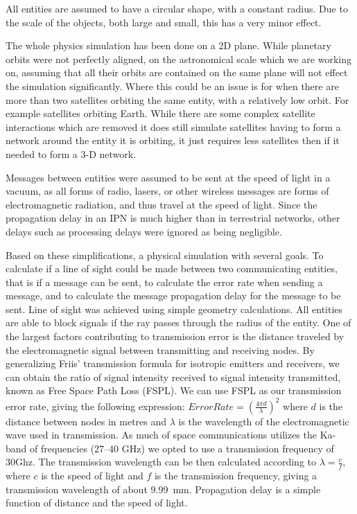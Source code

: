 \documentclass[a4paper,12pt]{article}
\begin{document}
All entities are assumed to have a circular shape, with a constant radius. Due
to the scale of the objects, both large and small, this has a very minor effect.

The whole physics simulation has been done on a 2D plane. While planetary orbits
were not perfectly aligned, on the astronomical scale which we are working on,
assuming that all their orbits are contained on the same plane will not effect
the simulation significantly. Where this could be an issue is for when there are
more than two satellites orbiting the same entity, with a relatively low orbit.
For example satellites orbiting Earth. While there are some complex satellite
interactions which are removed it does still simulate satellites having to form
a network around the entity it is orbiting, it just requires less satellites
then if it needed to form a 3-D network.

Messages between entities were assumed to be sent at the speed of light in a
vacuum, as all forms of radio, lasers, or other wireless messages are forms of
electromagnetic radiation, and thus travel at the speed of light. Since the
propagation delay in an IPN is much higher than in terrestrial networks, other
delays such as processing delays were ignored as being negligible.

Based on these simplifications, a physical simulation with several goals. To
calculate if a line of sight could be made between two communicating entities,
that is if a message can be sent, to calculate the error rate when sending a
message, and to calculate the message propagation delay for the message to be
sent. Line of sight was achieved using simple geometry calculations. All
entities are able to block signals if the ray passes through the radius of the
entity. One of the largest factors contributing to transmission error is the
distance traveled by the electromagnetic signal between transmitting and
receiving nodes. By generalizing Friis' transmission formula\cite{Friis} for
isotropic emitters and receivers, we can obtain the ratio of signal intensity
received to signal intensity transmitted, known as Free Space Path Loss (FSPL).
We can use FSPL as our transmission error rate, giving the following expression:
$Error Rate = {(\frac{4 \pi d}{\lambda})}^2$ where $d$ is the distance between
nodes in metres and $\lambda$ is the wavelength of the electromagnetic wave used
in transmission. As much of space communications utilizes the Ka-band of
frequencies (27--40 GHz)\cite{Morabito_Hastrup} we opted to use a transmission
frequency of 30Ghz. The transmission wavelength can be then calculated according
to $\lambda = \frac{c}{f}$, where $c$ is the speed of light and $f$ is the
transmission frequency, giving a transmission wavelength of about 9.99~mm.
Propagation delay is a simple function of distance and the speed of light.
\end{document}
